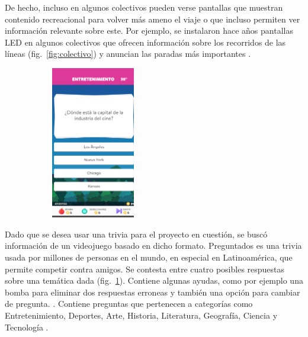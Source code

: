 \documentclass{article}
\begin{document}
De hecho, incluso en algunos colectivos pueden verse pantallas que muestran contenido recreacional para volver más ameno el viaje o que incluso permiten ver información relevante sobre este. Por ejemplo, se instalaron hace años pantallas LED en algunos colectivos que ofrecen información sobre los recorridos de las líneas (fig.~\ref{fig:colectivo}) y anuncian las paradas más importantes \parencite{lacapitalColectivos}.
\begin{figure}[H]
	\caption{Preguntados}
    \begin{subfigure}{1.0\textwidth}
	\includegraphics[width=0.4\textwidth]{preguntados.png}
    \end{subfigure}
	\label{fig:preguntados}
\end{figure}
\vspace{-1.0\baselineskip}
Dado que se desea usar una trivia para el proyecto en cuestión, se buscó información de un videojuego basado en dicho formato. Preguntados es una trivia usada por millones de personas en el mundo, en especial en Latinoamérica, que permite competir contra amigos. Se contesta entre cuatro posibles respuestas sobre una temática dada (fig.~\ref{fig:preguntados}). Contiene algunas ayudas, como por ejemplo una bomba para eliminar dos respuestas erroneas y también una opción para cambiar de pregunta. \parencite{minutouno}. Contiene preguntas que pertenecen a categorías como Entretenimiento, Deportes, Arte, Historia, Literatura, Geografía, Ciencia y Tecnología \parencite{abcPreguntados}.
\end{document}
